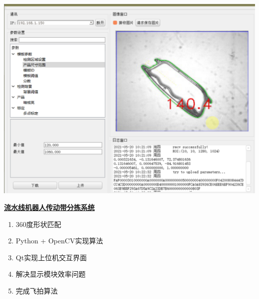 \documentclass[lighthipster]{simplehipstercv}
\begin{document}
\begin{minipage}[t]{\textwidth}
		\begin{minipage}[thbp]{\textwidth}
		\begin{minipage}[thbp]{0.3\textwidth}
			\includegraphics[width=\linewidth]{PrjMy_3.png}
		\end{minipage} 
		\hfill
		\begin{minipage}[thbp!]{0.6\textwidth}
			\textbf{\underline{流水线机器人传动带分拣系统}}
			\begin{enumerate}
				\item 360度形状匹配
				\item Python + OpenCV实现算法
				\item Qt实现上位机交互界面
				\item 解决显示模块效率问题
				\item 完成飞拍算法
			\end{enumerate}
		\end{minipage}
		\bigskip
		\end{minipage}
		
		\bigskip
	\end{minipage}
	
	\vspace{2em}
	\vfill{}
	
\end{document}
